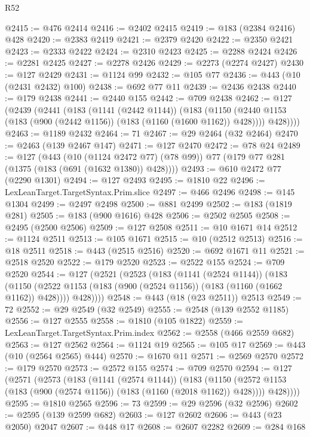 \begin{lexlean}{R52}
\begin{coremodule}
@2415 := @476 @2414
@2416 := @2402 @2415
@2419 := @183 (@2384 @2416) @428
@2420 := @2383 @2419
@2421 := @2379 @2420
@2422 := @2350 @2421
@2423 := @2333 @2422
@2424 := @2310 @2423
@2425 := @2288 @2424
@2426 := @2281 @2425
@2427 := @2278 @2426
@2429 := @2273 (@2274 @2427)
@2430 := @127 @2429
@2431 := @1124 @99
@2432 := @105 @77
@2436 := @443 (@10 (@2431 @2432) @100)
@2438 := @692 @77 @11
@2439 := @2436 @2438
@2440 := @179 @2438
@2441 := @2440 @155
@2442 := @709 @2438
@2462 := @127
    (@2439
      (@2441
        (@183
          (@1141 (@2442 @1144))
          (@183
            (@1150 (@2440 @1153 (@183 (@900 (@2442 @1156)) (@183 (@1160 (@1600 @1162)) @428))))
            @428))))
@2463 := @1189 @2432
@2464 := 71
@2467 := @29 @2464 (@32 @2464)
@2470 := @2463 (@139 @2467 @147)
@2471 := @127 @2470
@2472 := @78 @24
@2489 := @127
    (@443
      (@10 (@1124 @2472 @77) (@78 @99))
      @77
      (@179 @77 @281 (@1375 (@183 (@691 (@1632 @1380)) @428))))
@2493 := @610 @2472 @77 (@2290 @1301)
@2494 := @127 @2493
@2495 := @1810 @22
@2496 := LexLeanTarget.TargetSyntax.Prim.slice
@2497 := @466 @2496
@2498 := @145 @1304
@2499 := @2497 @2498
@2500 := @881 @2499
@2502 := @183 (@1819 @281)
@2505 := @183 (@900 @1616) @428
@2506 := @2502 @2505
@2508 := @2495 (@2500 @2506)
@2509 := @127 @2508
@2511 := @10 @1671 @14
@2512 := @1124 @2511
@2513 := @105 @1671
@2515 := @10 (@2512 @2513)
@2516 := @18 @2511
@2518 := @443 (@2515 @2516)
@2520 := @692 @1671 @11
@2521 := @2518 @2520
@2522 := @179 @2520
@2523 := @2522 @155
@2524 := @709 @2520
@2544 := @127
    (@2521
      (@2523
        (@183
          (@1141 (@2524 @1144))
          (@183
            (@1150 (@2522 @1153 (@183 (@900 (@2524 @1156)) (@183 (@1160 (@1662 @1162)) @428))))
            @428))))
@2548 := @443 (@18 (@23 @2511)) @2513
@2549 := 72
@2552 := @29 @2549 (@32 @2549)
@2555 := @2548 (@139 @2552 @1185)
@2556 := @127 @2555
@2558 := @1810 (@105 @1822)
@2559 := LexLeanTarget.TargetSyntax.Prim.index
@2562 := @2558 (@466 @2559 @682)
@2563 := @127 @2562
@2564 := @1124 @19
@2565 := @105 @17
@2569 := @443 (@10 (@2564 @2565) @444)
@2570 := @1670 @11
@2571 := @2569 @2570
@2572 := @179 @2570
@2573 := @2572 @155
@2574 := @709 @2570
@2594 := @127
    (@2571
      (@2573
        (@183
          (@1141 (@2574 @1144))
          (@183
            (@1150 (@2572 @1153 (@183 (@900 (@2574 @1156)) (@183 (@1160 (@2018 @1162)) @428))))
            @428))))
@2595 := @1810 @2565
@2596 := 73
@2599 := @29 @2596 (@32 @2596)
@2602 := @2595 (@139 @2599 @682)
@2603 := @127 @2602
@2606 := @443 (@23 @2050) @2047
@2607 := @448 @17
@2608 := @2607 @2282
@2609 := @284 @168

\end{coremodule}
\end{lexlean}
